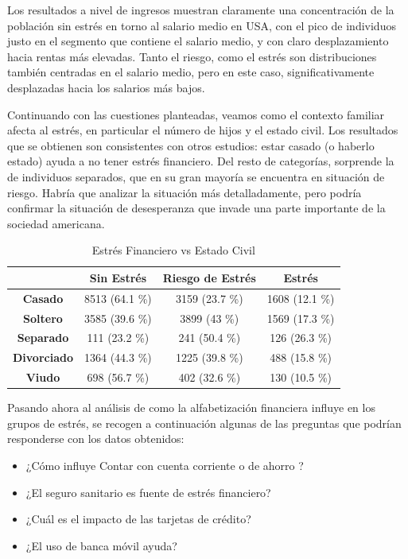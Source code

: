 \documentclass[a4paper, 11pt]{article}
\begin{document}
Los resultados a nivel de ingresos muestran claramente una 
concentración de la población sin estrés en torno al salario medio en USA, 
con el pico de individuos justo en el segmento que contiene el salario
medio, y con claro desplazamiento hacia rentas más elevadas. Tanto el riesgo, como 
el estrés son distribuciones también centradas en el salario medio, pero en este 
caso, significativamente desplazadas hacia los salarios más bajos. 

Continuando con las cuestiones planteadas, veamos como el contexto familiar afecta
al estrés, en particular el número de hijos y el estado civil. Los resultados que
se obtienen son consistentes con otros estudios: estar casado (o haberlo estado) 
ayuda a no tener estrés financiero. Del resto de categorías, sorprende la de 
individuos separados, que en su gran mayoría se encuentra en situación de riesgo.
Habría que analizar la situación más detalladamente, pero podría confirmar la 
situación de desesperanza que invade una parte importante de la sociedad americana.

\begin{table}[ht]
\centering
\begin{tabular}{cccc }
\toprule
 & \textbf{Sin Estrés} & \textbf{Riesgo de Estrés} & \textbf{Estrés}\\
\midrule
\textbf{Casado} & 8513 (64.1 \%) &	3159 (23.7 \%) &	1608 (12.1 \%)\\
\textbf{Soltero} & 3585 (39.6 \%) &	3899 (43 \%) &	1569 (17.3 \%)\\
\textbf{Separado} & 111 (23.2 \%) &	241 (50.4 \%) &	126 (26.3 \%)\\
\textbf{Divorciado} & 1364 (44.3 \%) &	1225 (39.8 \%) &	488 (15.8 \%)\\
\textbf{Viudo} & 698 (56.7 \%) &	402 (32.6 \%) &	130 (10.5 \%)\\
\bottomrule
\end{tabular}
\caption{Estrés Financiero vs Estado Civil}
\label{tab:stress_vs_marital}
\end{table}

Pasando ahora al análisis de como la alfabetización financiera influye en los
grupos de estrés, se recogen a continuación algunas de las preguntas que 
podrían responderse con los datos obtenidos:
\begin{itemize}
    \item ¿Cómo influye Contar con cuenta corriente o de ahorro ?
    \item ¿El seguro sanitario es fuente de estrés financiero?
    \item ¿Cuál es el impacto de las tarjetas de crédito?
    \item ¿El uso de banca móvil ayuda?
\end{itemize}
\end{document}
